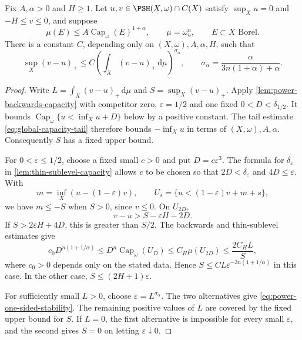 \begin{proposition}\label{prop:power-capacity-one-sided-stability}
Fix $A,\alpha>0$ and $H\geq1$. Let $u,v\in\PSH(X,\omega)\cap C(X)$ satisfy $\sup_Xu=0$ and $-H\leq v\leq0$, and suppose
\[
 \mu(E)\leq A\operatorname{Cap}_\omega(E)^{1+\alpha},
 \qquad \mu=\omega_u^n,
 \qquad E\subset X\text{ Borel}.
\]
There is a constant $C$, depending only on $(X,\omega),A,\alpha,H$, such that
\begin{equation}\label{eq:power-one-sided-stability}
 \sup_X(v-u)_+
 \leq C\left(\int_X(v-u)_+\,\mathrm d\mu\right)^{\sigma_\alpha},
 \qquad \sigma_\alpha=\frac{\alpha}{3n(1+\alpha)+\alpha}.
\end{equation}
\end{proposition}
\begin{proof}
Write $L=\int_X(v-u)_+\,\mathrm d\mu$ and $S=\sup_X(v-u)_+$. Apply \cref{lem:power-backwards-capacity} with competitor zero, $\varepsilon=1/2$ and one fixed $0<D<\delta_{1/2}$. It bounds $\operatorname{Cap}_\omega\{u<\inf_Xu+D\}$ below by a positive constant. The tail estimate \eqref{eq:global-capacity-tail} therefore bounds $-\inf_Xu$ in terms of $(X,\omega),A,\alpha$. Consequently $S$ has a fixed upper bound.

For $0<\varepsilon\leq1/2$, choose a fixed small $c>0$ and put $D=c\varepsilon^3$. The formula for $\delta_\varepsilon$ in \cref{lem:thin-sublevel-capacity} allows $c$ to be chosen so that $2D<\delta_\varepsilon$ and $4D\leq\varepsilon$. With
\[
 m=\inf_X(u-(1-\varepsilon)v),\qquad
 U_s=\{u<(1-\varepsilon)v+m+s\},
\]
we have $m\leq-S$ when $S>0$, since $v\leq0$. On $U_{2D}$,
\[
 v-u>S-\varepsilon H-2D.
\]
If $S>2\varepsilon H+4D$, this is greater than $S/2$. The backwards and thin-sublevel estimates give
\[
 c_0D^{n(1+1/\alpha)}
 \leq D^n\operatorname{Cap}_\omega(U_D)
 \leq C_H\mu(U_{2D})\leq\frac{2C_HL}{S},
\]
where $c_0>0$ depends only on the stated data. Hence $S\leq CL\varepsilon^{-3n(1+1/\alpha)}$ in this case. In the other case, $S\leq(2H+1)\varepsilon$.

For sufficiently small $L>0$, choose $\varepsilon=L^{\sigma_\alpha}$. The two alternatives give \eqref{eq:power-one-sided-stability}. The remaining positive values of $L$ are covered by the fixed upper bound for $S$. If $L=0$, the first alternative is impossible for every small $\varepsilon$, and the second gives $S=0$ on letting $\varepsilon\downarrow0$.
\end{proof}
